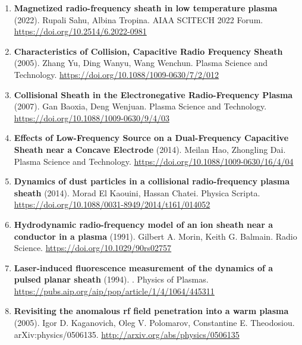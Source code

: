 \documentclass[11pt,a4paper]{article}
\begin{document}
\begin{enumerate}[leftmargin=1.4em]
\item \textbf{Magnetized radio-frequency sheath in low temperature plasma} (2022). Rupali Sahu, Albina Tropina. AIAA SCITECH 2022 Forum. \url{https://doi.org/10.2514/6.2022-0981}
\item \textbf{Characteristics of Collision, Capacitive Radio Frequency Sheath} (2005). Zhang Yu, Ding Wanyu, Wang Wenchun. Plasma Science and Technology. \url{https://doi.org/10.1088/1009-0630/7/2/012}
\item \textbf{Collisional Sheath in the Electronegative Radio-Frequency Plasma} (2007). Gan Baoxia, Deng Wenjuan. Plasma Science and Technology. \url{https://doi.org/10.1088/1009-0630/9/4/03}
\item \textbf{Effects of Low-Frequency Source on a Dual-Frequency Capacitive Sheath near a Concave Electrode} (2014). Meilan Hao, Zhongling Dai. Plasma Science and Technology. \url{https://doi.org/10.1088/1009-0630/16/4/04}
\item \textbf{Dynamics of dust particles in a collisional radio-frequency plasma sheath} (2014). Morad El Kaouini, Hassan Chatei. Physica Scripta. \url{https://doi.org/10.1088/0031-8949/2014/t161/014052}
\item \textbf{Hydrodynamic radio-frequency model of an ion sheath near a conductor in a plasma} (1991). Gilbert A. Morin, Keith G. Balmain. Radio Science. \url{https://doi.org/10.1029/90rs02757}
\item \textbf{Laser-induced fluorescence measurement of the dynamics of a pulsed planar sheath} (1994). . Physics of Plasmas. \url{https://pubs.aip.org/aip/pop/article/1/4/1064/445311}
\item \textbf{Revisiting the anomalous rf field penetration into a warm plasma} (2005). Igor D. Kaganovich, Oleg V. Polomarov, Constantine E. Theodosiou. arXiv:physics/0506135. \url{http://arxiv.org/abs/physics/0506135}
\end{enumerate}
\end{document}
